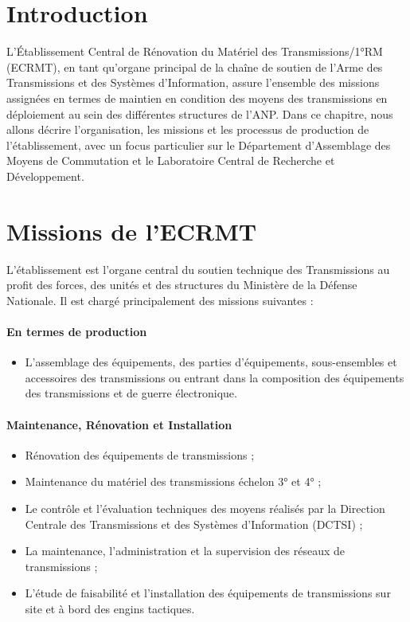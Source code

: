 \documentclass[12pt,a4paper,oneside]{report}
\begin{document}
\section{Introduction}
\label{sec:intro_ch1}

L’Établissement Central de Rénovation du Matériel des Transmissions/1°RM (ECRMT), en tant qu’organe principal de la chaîne de soutien de l’Arme des Transmissions et des Systèmes d’Information, assure l’ensemble des missions assignées en termes de maintien en condition des moyens des transmissions en déploiement au sein des différentes structures de l’ANP. Dans ce chapitre, nous allons décrire l’organisation, les missions et les processus de production de l’établissement, avec un focus particulier sur le Département d’Assemblage des Moyens de Commutation et le Laboratoire Central de Recherche et Développement.

\section{Missions de l'ECRMT}
\label{sec:missions_ecrmt}

L’établissement est l’organe central du soutien technique des Transmissions au profit des forces, des unités et des structures du Ministère de la Défense Nationale. Il est chargé principalement des missions suivantes :

\paragraph{En termes de production}
\begin{itemize}
    \item L’assemblage des équipements, des parties d’équipements, sous-ensembles et accessoires des transmissions ou entrant dans la composition des équipements des transmissions et de guerre électronique.
\end{itemize}

\paragraph{Maintenance, Rénovation et Installation}
\begin{itemize}
    \item Rénovation des équipements de transmissions ;
    \item Maintenance du matériel des transmissions échelon 3° et 4° ;
    \item Le contrôle et l’évaluation techniques des moyens réalisés par la Direction Centrale des Transmissions et des Systèmes d’Information (DCTSI) ;
    \item La maintenance, l’administration et la supervision des réseaux de transmissions ;
    \item L’étude de faisabilité et l’installation des équipements de transmissions sur site et à bord des engins tactiques.
\end{itemize}
\end{document}
